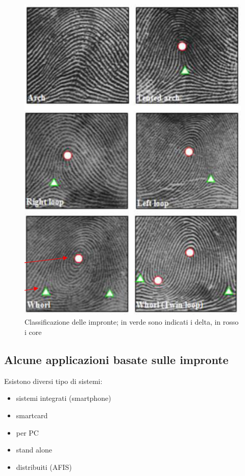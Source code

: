 \begin{figure}[ht]
    \centering
    \includegraphics[width=0.6\linewidth]{images-chap5/classificazione.png}
    \caption{Classificazione delle impronte; in verde sono indicati i delta, in rosso i core}
\end{figure}

\subsection{Alcune applicazioni basate sulle impronte}

Esistono diversi tipo di sistemi:
\begin{itemize}
    \item sistemi integrati (smartphone)
    \item smartcard
    \item per PC
    \item stand alone
    \item distribuiti (AFIS)
\end{itemize}

